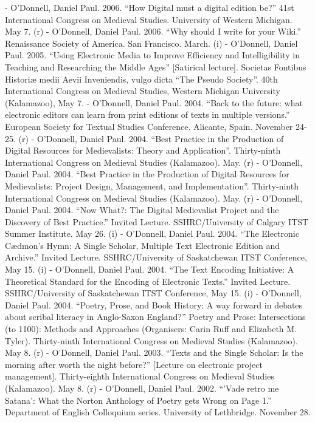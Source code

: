 - O'Donnell, Daniel Paul. 2006. “How Digital must a digital edition be?” 41st International Congress on Medieval Studies. University of Western Michigan. May 7. (r)
- O'Donnell, Daniel Paul. 2006. “Why should I write for your Wiki.” Renaissance Society of America. San Francisco. March. (i)
- O'Donnell, Daniel Paul. 2005. “Using Electronic Media to Improve Efficiency and Intelligibility in Teaching and Researching the Middle Ages” [Satirical lecture]. Societas Fontibus Historiæ medii Aevii Inveniendis, vulgo dicta “The Pseudo Society”. 40th International Congress on Medieval Studies, Western Michigan University (Kalamazoo), May 7.
- O'Donnell, Daniel Paul. 2004. “Back to the future: what electronic editors can learn from print editions of texts in multiple versions.” European Society for Textual Studies Conference. Alicante, Spain. November 24-25. (r)
- O'Donnell, Daniel Paul. 2004. “Best Practice in the Production of Digital Resources for Medievalists: Theory and Application”. Thirty-ninth International Congress on Medieval Studies (Kalamazoo). May. (r)
- O'Donnell, Daniel Paul. 2004. “Best Practice in the Production of Digital Resources for Medievalists: Project Design, Management, and Implementation”. Thirty-ninth International Congress on Medieval Studies (Kalamazoo). May. (r)
- O'Donnell, Daniel Paul. 2004. “Now What?: The Digital Medievalist Project and the Discovery of Best Practice.” Invited Lecture. SSHRC/\allowbreak{}University of Calgary ITST Summer Institute. May 26. (i)
- O'Donnell, Daniel Paul. 2004. “The Electronic Cædmon's Hymn: A Single Scholar, Multiple Text Electronic Edition and Archive.” Invited Lecture. SSHRC/\allowbreak{}University of Saskatchewan ITST Conference, May 15. (i)
- O'Donnell, Daniel Paul. 2004. “The Text Encoding Initiative: A Theoretical Standard for the Encoding of Electronic Texts.” Invited Lecture. SSHRC/\allowbreak{}University of Saskatchewan ITST Conference, May 15. (i)
- O'Donnell, Daniel Paul. 2004. “Poetry, Prose, and Book History: A way forward in debates about scribal literacy in Anglo-Saxon England?” Poetry and Prose: Intersections (to 1100): Methods and Approaches (Organisers: Carin Ruff and Elizabeth M. Tyler). Thirty-ninth International Congress on Medieval Studies (Kalamazoo). May 8. (r)
- O'Donnell, Daniel Paul. 2003. “Texts and the Single Scholar: Is the morning after worth the night before?” [Lecture on electronic project management]. Thirty-eighth International Congress on Medieval Studies (Kalamazoo). May 8. (r)
- O'Donnell, Daniel Paul. 2002. “'Vade retro me Satana': What the Norton Anthology of Poetry gets Wrong on Page 1.” Department of English Colloquium series. University of Lethbridge. November 28.
